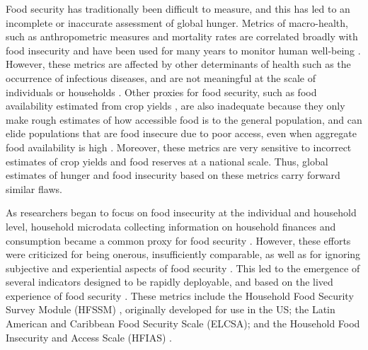 \documentclass{article}
\begin{document}
Food security has traditionally been difficult to measure, and this has led to an incomplete or inaccurate assessment of global hunger. Metrics of macro-health, such as anthropometric measures and mortality rates are correlated broadly with food insecurity and have been used for many years to monitor human well-being \citep{Puffer1973, Habicht1974}.  However, these metrics are affected by other determinants of health such as the occurrence of infectious diseases, and are not meaningful at the scale of individuals or households \citep{Perumal2018}.  Other proxies for food security, such as food availability estimated from crop yields \citep{Maxwell1992}, are also inadequate because they only make rough estimates of how accessible food is to the general population, and can elide populations that are food insecure due to poor access, even when aggregate food availability is high \citep{Sen1983}.  Moreover, these metrics are very sensitive to incorrect estimates of crop yields and food reserves at a national scale.  Thus, global estimates of hunger and food insecurity based on these metrics carry forward similar flaws.

As researchers began to focus on food insecurity at the individual and household level, household microdata collecting information on household finances and consumption became a common proxy for food security \citep{Haddad1994}.  However, these efforts were criticized for being onerous, insufficiently comparable, as well as for ignoring subjective and experiential aspects of food security \citep{Maxwell1996}.  This led to the emergence of several indicators designed to be rapidly deployable, and based on the lived experience of food security \citep{Jones2013}.  These metrics include the Household Food Security Survey Module (HFSSM) \citep{kennedy2005keynote}, originally developed for use in the US; the Latin American and Caribbean Food Security Scale (ELCSA); and the Household Food Insecurity and Access Scale (HFIAS) \citep{Coates2007}.
\end{document}
